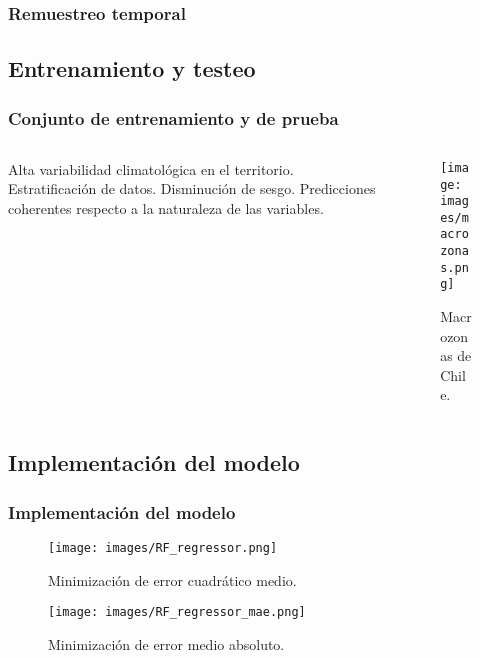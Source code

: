 \documentclass{beamer}
\begin{document}
  \begin{frame}
    \frametitle{Remuestreo temporal}
  \end{frame}

  \subsection*{Entrenamiento y testeo}

  \begin{frame}
    \frametitle{Conjunto de entrenamiento y de prueba}

    \begin{columns}

      \begin{column}{0.5\textwidth}
        \begin{outline}
          \1 Alta variabilidad climatológica en el territorio.
          \1 Estratificación de datos.
            \2 Disminución de sesgo.
            \2 Predicciones coherentes respecto a la naturaleza de las variables.
        \end{outline}
      \end{column}

      \begin{column}{0.5\textwidth}
        \begin{figure}
          \begin{center}
            \texttt{[image: images/macrozonas.png]}
          \end{center}
          \caption{Macrozonas de Chile.}
        \end{figure}
      \end{column}

    \end{columns}
  \end{frame}

  \subsection*{Implementación del modelo}
  
  \begin{frame}
    \frametitle{Implementación del modelo}

    \centering
    \begin{figure}
      \texttt{[image: images/RF\_regressor.png]}
      \caption{Minimización de error cuadrático medio.}

     \texttt{[image: images/RF\_regressor\_mae.png]}
     \caption{Minimización de error medio absoluto.}

    \end{figure}
  \end{frame}
\end{document}
